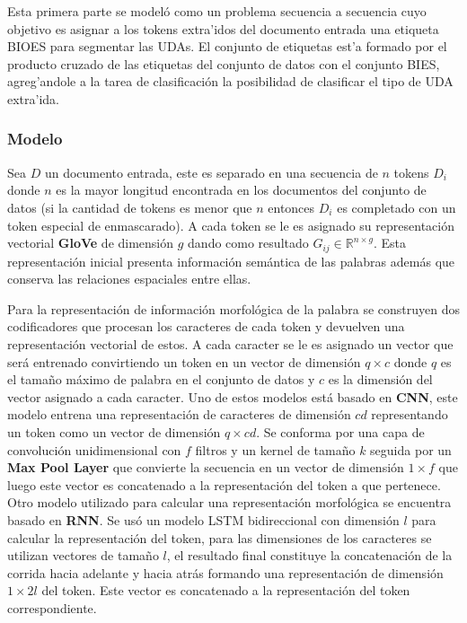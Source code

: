 Esta primera parte se modeló como un problema secuencia a secuencia cuyo objetivo es asignar a los tokens 
extra'idos del documento entrada una etiqueta BIOES para segmentar las UDAs. El conjunto de etiquetas 
est'a formado por el producto cruzado de las etiquetas del conjunto de datos con el conjunto BIES, agreg'andole
a la tarea de clasificación la posibilidad de clasificar el tipo de UDA extra'ida.

\subsubsection{Modelo}

Sea $D$ un documento entrada, este es separado en una secuencia de $n$ tokens $D_i$ donde $n$ es la mayor longitud encontrada
en los documentos del conjunto de datos (si la cantidad de tokens es menor que $n$ entonces $D_i$ es completado con un token especial de enmascarado). 
A cada token se le es asignado
su representación vectorial \textbf{GloVe} de dimensión $g$ dando como resultado $G_{ij} \in \mathbb{R}^{n \times g}$.
Esta representación inicial presenta información semántica de las palabras además que conserva las relaciones 
espaciales entre ellas. 

Para la representación de información morfológica de la palabra se construyen dos
codificadores que procesan los caracteres de cada token y devuelven una representación vectorial de estos.
A cada caracter se le es asignado un vector que será entrenado convirtiendo un token en un vector de dimensión
$q \times c$ donde $q$ es el tamaño máximo de palabra en el conjunto de datos y $c$ es la dimensión del vector
asignado a cada caracter.
Uno de estos modelos está basado en \textbf{CNN}, este modelo entrena una representación de caracteres de dimensión
$cd$ representando un token como un vector de dimensión $q \times cd$. Se conforma por una capa de convolución unidimensional
con $f$ filtros y un kernel de tamaño $k$ seguida por un \textbf{Max Pool Layer} que convierte la secuencia en un vector
de dimensión $1 \times f$ que luego este vector es concatenado a la representación del token a que pertenece.
Otro modelo utilizado para calcular una representación morfológica se encuentra basado en \textbf{RNN}. Se usó
un modelo LSTM bidireccional con dimensión $l$ para calcular la representación del token, para las dimensiones de los caracteres se
utilizan vectores de tamaño $l$, el resultado final constituye la concatenación de la corrida hacia adelante y
hacia atrás formando una representación de dimensión $1 \times 2l$ del token. Este vector es concatenado a la representación
del token correspondiente.

